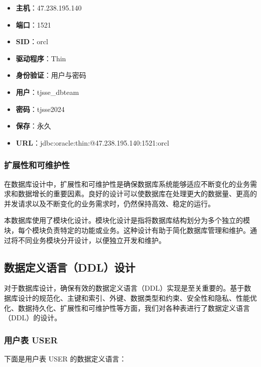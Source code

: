 \begin{itemize}
    \item \textbf{主机}：47.238.195.140
    \item \textbf{端口}：1521
    \item \textbf{SID}：orcl
    \item \textbf{驱动程序}：Thin
    \item \textbf{身份验证}：用户与密码
    \item \textbf{用户}：tjsse\_dbteam
    \item \textbf{密码}：tjsse2024
    \item \textbf{保存}：永久
    \item \textbf{URL}：jdbc:oracle:thin:@47.238.195.140:1521:orcl
\end{itemize}

\subsubsection{扩展性和可维护性}

在数据库设计中，扩展性和可维护性是确保数据库系统能够适应不断变化的业务需求和数据增长的重要因素。良好的设计可以使数据库在处理更大的数据量、更高的并发请求以及不断变化的业务需求时，仍然保持高效、稳定的运行。

本数据库使用了模块化设计。模块化设计是指将数据库结构划分为多个独立的模块，每个模块负责特定的功能或业务。这种设计有助于简化数据库管理和维护。通过将不同业务模块分开设计，以便独立开发和维护。

\subsection{数据定义语言（DDL）设计}

对于数据库设计，确保有效的数据定义语言（DDL）实现是至关重要的。基于数据库设计的规范化、主键和索引、外键、数据类型和约束、安全性和隐私、性能优化、数据持久化、扩展性和可维护性等方面，我们对各种表进行了数据定义语言（DDL）的设计。

\subsubsection{用户表 USER}

下面是用户表 USER 的数据定义语言：

